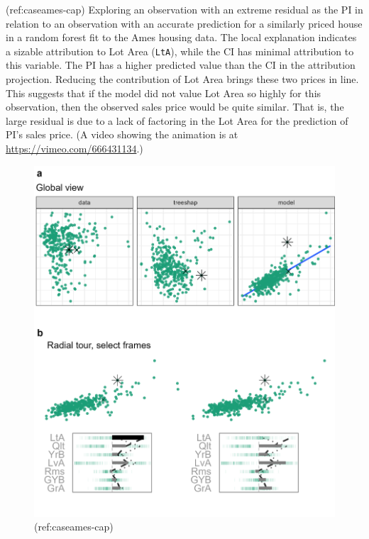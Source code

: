 \documentclass[
]{jss}
\begin{document}
(ref:caseames-cap) Exploring an observation with an extreme residual as
the PI in relation to an observation with an accurate prediction for a
similarly priced house in a random forest fit to the Ames housing data.
The local explanation indicates a sizable attribution to Lot Area
(\texttt{LtA}), while the CI has minimal attribution to this variable.
The PI has a higher predicted value than the CI in the attribution
projection. Reducing the contribution of Lot Area brings these two
prices in line. This suggests that if the model did not value Lot Area
so highly for this observation, then the observed sales price would be
quite similar. That is, the large residual is due to a lack of factoring
in the Lot Area for the prediction of PI's sales price. (A video showing
the animation is at \url{https://vimeo.com/666431134}.)

\begin{CodeChunk}
\begin{figure}

{\centering \includegraphics[width=0.9\linewidth]{./figures/case_ames2018} 

}

\caption[(ref:caseames-cap)]{(ref:caseames-cap)}\label{fig:caseames}
\end{figure}
\end{CodeChunk}
\end{document}

